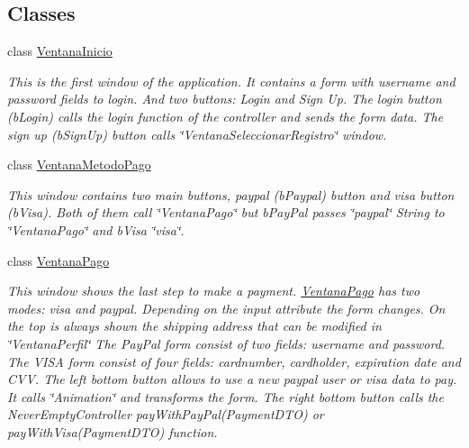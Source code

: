 \subsection*{Classes}
\begin{DoxyCompactItemize}
\item 
class \mbox{\hyperlink{class_s_p_q_1_1gui_1_1_ventana_inicio}{Ventana\+Inicio}}
\begin{DoxyCompactList}\small\item\em This is the first window of the application. It contains a form with username and password fields to login. And two buttons\+: Login and Sign Up. The login button (b\+Login) calls the login function of the controller and sends the form data. The sign up (b\+Sign\+Up) button calls \char`\"{}\+Ventana\+Seleccionar\+Registro\char`\"{} window. \end{DoxyCompactList}\item 
class \mbox{\hyperlink{class_s_p_q_1_1gui_1_1_ventana_metodo_pago}{Ventana\+Metodo\+Pago}}
\begin{DoxyCompactList}\small\item\em This window contains two main buttons, paypal (b\+Paypal) button and visa button (b\+Visa). Both of them call \char`\"{}\+Ventana\+Pago\char`\"{} but b\+Pay\+Pal passes \char`\"{}paypal\char`\"{} String to \char`\"{}\+Ventana\+Pago\char`\"{} and b\+Visa \char`\"{}visa\char`\"{}. \end{DoxyCompactList}\item 
class \mbox{\hyperlink{class_s_p_q_1_1gui_1_1_ventana_pago}{Ventana\+Pago}}
\begin{DoxyCompactList}\small\item\em This window shows the last step to make a payment. \mbox{\hyperlink{class_s_p_q_1_1gui_1_1_ventana_pago}{Ventana\+Pago}} has two modes\+: visa and paypal. Depending on the input attribute the form changes. On the top is always shown the shipping address that can be modified in \char`\"{}\+Ventana\+Perfil\char`\"{} The Pay\+Pal form consist of two fields\+: username and password. The V\+I\+SA form consist of four fields\+: cardnumber, cardholder, expiration date and C\+VV. The left bottom button allows to use a new paypal user or visa data to pay. It calls \char`\"{}\+Animation\char`\"{} and transforms the form. The right bottom button calls the Never\+Empty\+Controller pay\+With\+Pay\+Pal(\+Payment\+D\+T\+O) or pay\+With\+Visa(\+Payment\+D\+T\+O) function. \end{DoxyCompactList}\item 

\end{DoxyCompactItemize}
